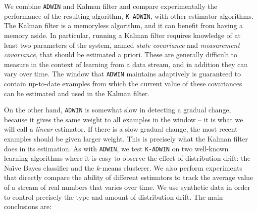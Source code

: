 We combine {\tt ADWIN} and Kalman filter and
compare experimentally the performance of the resulting algorithm, 
{\tt K-ADWIN}, with other estimator algorithms. %
\BEGINOMIT
The Kalman filter is a memoryless algorithm, and it can benefit from having
a memory aside. In particular, running a Kalman filter requires
knowledge of at least two parameters of the system, named
{\em state covariance} and {\em measurement covariance}, that should
be estimated a priori. These are generally difficult to measure in the context
of learning from a data stream, and in addition they can vary over time. 
The window that {\tt ADWIN} maintains adaptively is guaranteed
to contain up-to-date examples from which the current value of
these covariances can be estimated and used in the Kalman filter. 

On the other hand, {\tt ADWIN} is somewhat slow in detecting
a gradual change, because it gives the same weight
to all examples in the window -- it is what we will call a {\em linear}
estimator. If there is a slow gradual change, 
the most recent examples should be given larger weight. This is
precisely what the Kalman filter does in its estimation. 
\ENDOMIT
As with {\tt ADWIN}, we test {\tt K-ADWIN} on two well-known learning 
algorithms where it is easy to observe the effect of distribution drift:
the Na\"\i ve Bayes classifier and the $k$-means
clusterer.
\BEGINOMIT
 We also perform experiments that directly compare the ability
of different estimators to track the average value of a stream of real numbers
that varies over time. 
We use synthetic data in order to control precisely
the type and amount of distribution drift. The main conclusions are: 

